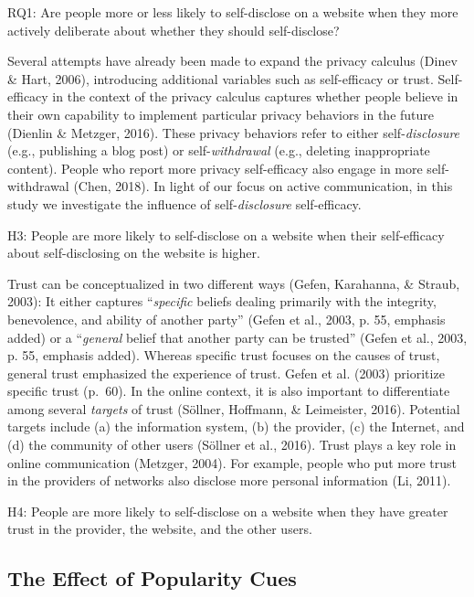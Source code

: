 \documentclass[
  english,
  man,floatsintext]{apa6}
\begin{document}
RQ1: Are people more or less likely to self-disclose on a website when they more actively deliberate about whether they should self-disclose?

Several attempts have already been made to expand the privacy calculus (Dinev \& Hart, 2006), introducing additional variables such as self-efficacy or trust.
Self-efficacy in the context of the privacy calculus captures whether people believe in their own capability to implement particular privacy behaviors in the future (Dienlin \& Metzger, 2016).
These privacy behaviors refer to either self-\emph{disclosure} (e.g., publishing a blog post) or self-\emph{withdrawal} (e.g., deleting inappropriate content).
People who report more privacy self-efficacy also engage in more self-withdrawal (Chen, 2018).
In light of our focus on active communication, in this study we investigate the influence of self-\emph{disclosure} self-efficacy.

H3: People are more likely to self-disclose on a website when their self-efficacy about self-disclosing on the website is higher.

Trust can be conceptualized in two different ways (Gefen, Karahanna, \& Straub, 2003):
It either captures \enquote{\emph{specific} beliefs dealing primarily with the integrity, benevolence, and ability of another party} (Gefen et al., 2003, p. 55, emphasis added) or a \enquote{\emph{general} belief that another party can be trusted} (Gefen et al., 2003, p. 55, emphasis added).
Whereas specific trust focuses on the causes of trust, general trust emphasized the experience of trust.
Gefen et al. (2003) prioritize specific trust (p.~60).
In the online context, it is also important to differentiate among several \emph{targets} of trust (Söllner, Hoffmann, \& Leimeister, 2016).
Potential targets include (a) the information system, (b) the provider, (c) the Internet, and (d) the community of other users (Söllner et al., 2016).
Trust plays a key role in online communication (Metzger, 2004).
For example, people who put more trust in the providers of networks also disclose more personal information (Li, 2011).

H4: People are more likely to self-disclose on a website when they have greater trust in the provider, the website, and the other users.

\hypertarget{the-effect-of-popularity-cues}{%
\subsection{The Effect of Popularity Cues}\label{the-effect-of-popularity-cues}}
\end{document}
